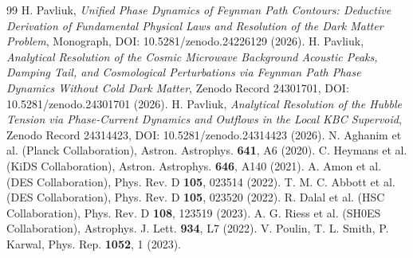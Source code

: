 \documentclass[11pt,a4paper]{article}
\begin{document}
\begin{thebibliography}{99}
 H. Pavliuk, \textit{Unified Phase Dynamics of Feynman Path Contours: Deductive Derivation of Fundamental Physical Laws and Resolution of the Dark Matter Problem}, Monograph, DOI: 10.5281/zenodo.24226129 (2026).
 H. Pavliuk, \textit{Analytical Resolution of the Cosmic Microwave Background Acoustic Peaks, Damping Tail, and Cosmological Perturbations via Feynman Path Phase Dynamics Without Cold Dark Matter}, Zenodo Record 24301701, DOI: 10.5281/zenodo.24301701 (2026).
 H. Pavliuk, \textit{Analytical Resolution of the Hubble Tension via Phase-Current Dynamics and Outflows in the Local KBC Supervoid}, Zenodo Record 24314423, DOI: 10.5281/zenodo.24314423 (2026).
 N. Aghanim et al. (Planck Collaboration), Astron. Astrophys. \textbf{641}, A6 (2020).
 C. Heymans et al. (KiDS Collaboration), Astron. Astrophys. \textbf{646}, A140 (2021).
 A. Amon et al. (DES Collaboration), Phys. Rev. D \textbf{105}, 023514 (2022).
 T. M. C. Abbott et al. (DES Collaboration), Phys. Rev. D \textbf{105}, 023520 (2022).
 R. Dalal et al. (HSC Collaboration), Phys. Rev. D \textbf{108}, 123519 (2023).
 A. G. Riess et al. (SH0ES Collaboration), Astrophys. J. Lett. \textbf{934}, L7 (2022).
 V. Poulin, T. L. Smith, P. Karwal, Phys. Rep. \textbf{1052}, 1 (2023).
\end{thebibliography}
\end{document}
